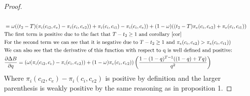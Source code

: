 \begin{proof}
\begin{align*}
\\
& = \omega ((t_2-T) (\pi_{i}(c_{i2},c_{e})- \pi_{i}(c_{i},c_{e2})) + \pi_i(c_i,c_{i1}) -\pi_i(c_i,c_{e}) ) 
+ (1-\omega)((t_2-T) \pi_{e}(c_{i},c_{e2}) + \pi_e(c_i,c_{i1}))
\\
& \text{The first term is positive due to the fact that } T-t_2 \geq 1 \text{ and  corollary \ref{cor}} 
\\
& \text{For the second term we can see that it is negative due to } T-t_2 \geq 1 \text{ and } \pi_{e}(c_{i},c_{e2})>\pi_e(c_i,c_{i1})) \\
& \text{We can also see that the derivative of this function with respect to q is well defined and positive:} \\
&\frac{\partial \Delta B}{\partial q} = \left(\omega (\pi_{i}(c_{i2},c_{e})- \pi_{i}(c_{i},c_{e2}))+(1-\omega)\pi_{e}(c_{i},c_{e2}) \right) \left(\frac{1-(1-q)^{T-1}((1-q)+T q) }{q^2} \right)
\end{align*}
Where $\pi_{i}(c_{i2},c_{e})- \pi_{i}(c_{i},c_{e2})$ is positive by definition and the larger parenthesis is weakly positive by the same reasoning as in proposition 1. 
\end{proof}



